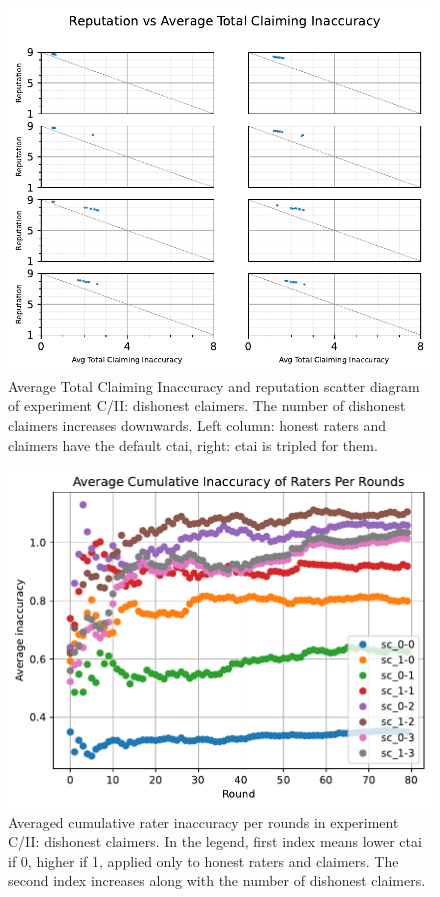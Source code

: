 \documentclass[%
    ]{\PathToTumTemplate/thesis/tum_thesis}
\begin{document}
\begin{figure}[tbp]
  \begin{center}
        \includegraphics[width=0.75\linewidth]	{../results/c2/AvgTotClaimInaccuracyAndReputationScatter_joined.pdf}
    \caption{
    Average Total Claiming Inaccuracy and reputation scatter diagram of experiment C/II: dishonest claimers.
    The number of dishonest claimers increases downwards.
    Left column: honest raters and claimers have the default \gls{ctai}, right: \gls{ctai} is tripled for them.
    }
    \label{fig:res_c2_scatter}
  \end{center}
\end{figure}

\begin{figure}[tbp]
  \begin{center}
        \includegraphics[width=0.75\linewidth]	{../results/c2/AvgAccuracyPerRound.pdf}
    \caption{
    Averaged cumulative rater inaccuracy per rounds in experiment C/II: dishonest claimers.
    In the legend, first index means lower \gls{ctai} if 0, higher if 1, applied only to honest raters and claimers.
    The second index increases along with the number of dishonest claimers.
    }
    \label{fig:res_c2_rateinaccuracy}
  \end{center}
\end{figure}
\end{document}
